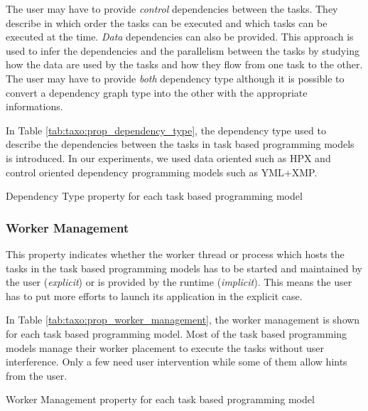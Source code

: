 The user may have to provide \textit{control} dependencies between the tasks.
They describe in which order the tasks can be executed and which tasks can be executed at the time.
\textit{Data} dependencies can also be provided.
This approach is used to infer the dependencies and the parallelism between the tasks by studying how the data are used by the tasks and how they flow from one task to the other.
The user may have to provide \textit{both} dependency type although it is possible to convert a dependency graph type into the other with the appropriate informations.

In Table \ref{tab:taxo:prop_dependency_type}, the dependency type used to describe the dependencies between the tasks in task based programming models is introduced.
In our experiments, we used data oriented such as HPX and control oriented dependency programming models such as YML+XMP.

\begin{table}[H]
	\caption{Dependency Type property for each task based programming model \label{tab:taxo:prop_dependency_type}}
	\centering
	\begin{multicols}{2}
		

		
	\end{multicols}
\end{table}

\subsubsection{Worker Management}
This property indicates whether the worker thread or process which hosts the tasks in the task based programming models has to be started and maintained by the user (\textit{explicit}) or is provided by the runtime (\textit{implicit}).
This means the user has to put more efforts to launch its application in the explicit case.

In Table \ref{tab:taxo:prop_worker_management}, the worker management is shown for each task based programming model.
Most of the task based programming models manage their worker placement to execute the tasks without user interference.
Only a few need user intervention while some of them allow hints from the user.

\begin{table}[H]
	\caption{Worker Management property for each task based programming model \label{tab:taxo:prop_worker_management}}
	\centering
	\begin{multicols}{2}
		

		
	\end{multicols}
\end{table}

